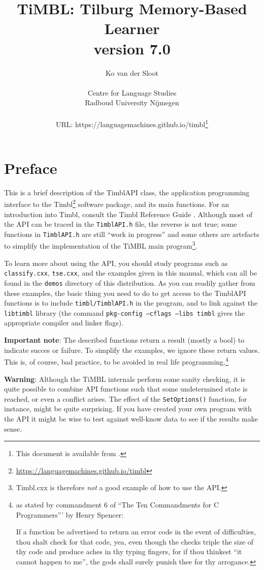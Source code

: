 \documentclass{report}
\author{Ko van der Sloot\\ \ \\
        Centre for Language Studies \\
        Radboud University Nijmegen \\ \ \\
        URL: https://languagemachines.github.io/timbl\thanks{This
        document is available from \apimanualurl.}}
\title{{\huge TiMBL: Tilburg Memory-Based Learner} \\ \vspace*{0.5cm}
{\bf version 7.0} \\ \vspace*{0.5cm}{\huge API Reference Guide}}
\begin{document}
\maketitle

\tableofcontents

\chapter*{Preface}

This is a brief description of the TimblAPI class, the application
programming interface to the
Timbl\footnote{\url{https://languagemachines.github.io/timbl}}
software package, and its main functions. For an introduction into
Timbl, consult the Timbl Reference Guide \cite{Daelemans+26}. Although
most of the API can be traced in the {\tt TimblAPI.h} file, the
reverse is not true; some functions in {\tt TimblAPI.h} are still
``work in progress'' and some others are artefacts to simplify the
implementation of the TiMBL main program\footnote{Timbl.cxx is
  therefore {\em not} a good example of how to use the API.}.

To learn more about using the API, you should study programs such as
{\tt classify.cxx}, {\tt tse.cxx}, and the examples given in this
manual, which can all be found in the {\tt demos} directory of this
distribution. As you can readily gather from these examples, the basic
thing you need to do to get access to the TimblAPI functions is to
include {\tt timbl/TimblAPI.h} in the program, and to link against the
{\tt libtimbl} library (the command {\tt pkg-config --cflags --libs
  timbl} gives the appropriate compiler and linker flags).

{\bf Important note}: The described functions return a result (mostly
a bool) to indicate succes or failure. To simplify the examples, we
ignore these return values. This is, of course, bad practice, to be avoided in
real life programming.\footnote{as stated by commandment 6 of ``The
  Ten Commandments for C Programmers''' by Henry Spencer:

If a function be advertised to return an error code in the event of
difficulties, thou shalt check for that code, yea, even though the
checks triple the size of thy code and produce aches in thy typing
fingers, for if thou thinkest ``it cannot happen to me'', the gods
shall surely punish thee for thy arrogance.}

{\bf Warning}: Although the TiMBL internals perform some sanity
checking, it is quite possible to combine API functions such
that some undetermined state is reached, or even a conflict
arises. The effect of the {\tt SetOptions()} function, for instance,
might be quite surprising. If you have created your own program
with the API it might be wise to test against well-know data to see if
the results make sense.
\end{document}
